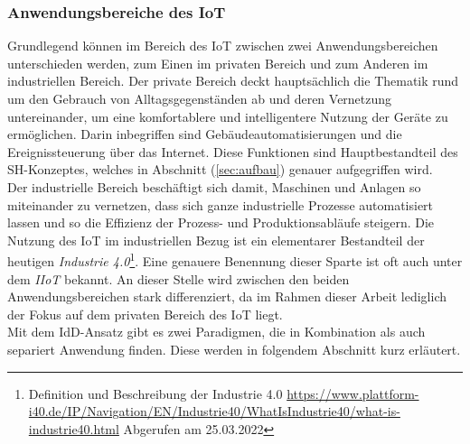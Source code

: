     \subsubsection*{Anwendungsbereiche des \acs{IoT}}
        Grundlegend können im Bereich des \acl{IoT} zwischen zwei Anwendungsbereichen unterschieden werden, zum Einen im privaten Bereich und zum 
        Anderen im industriellen Bereich. Der private Bereich deckt hauptsächlich die Thematik rund um den Gebrauch von Alltagsgegenständen ab und 
        deren Vernetzung untereinander, um eine komfortablere und intelligentere Nutzung der Geräte zu ermöglichen. Darin inbegriffen sind 
        Gebäudeautomatisierungen und die Ereignissteuerung über das Internet. Diese Funktionen sind Hauptbestandteil des \acl{SH}-Konzeptes, welches 
        in Abschnitt (\ref{sec:aufbau}) genauer aufgegriffen wird. 
        \\
        \linebreak
        Der industrielle Bereich beschäftigt sich damit, Maschinen und Anlagen so miteinander zu vernetzen, dass sich ganze industrielle Prozesse 
        automatisiert lassen und so die Effizienz der Prozess- und Produktionsabläufe steigern. Die Nutzung des \acs{IoT} im industriellen Bezug 
        ist ein elementarer Bestandteil der heutigen \textit{Industrie 4.0}\footnote{Definition und Beschreibung der Industrie 4.0 \url{https://www.plattform-i40.de/IP/Navigation/EN/Industrie40/WhatIsIndustrie40/what-is-industrie40.html} Abgerufen am 25.03.2022}.
        Eine genauere Benennung dieser Sparte ist oft auch unter dem \textit{\ac{IIoT}} bekannt. An dieser Stelle wird zwischen den beiden Anwendungsbereichen 
        stark differenziert, da im Rahmen dieser Arbeit lediglich der Fokus auf dem privaten Bereich des \acs{IoT} liegt. 
        \\
        \linebreak
        Mit dem \acl{IdD}-Ansatz gibt es zwei Paradigmen, die in Kombination als auch separiert Anwendung finden. Diese werden in folgendem Abschnitt kurz erläutert.

